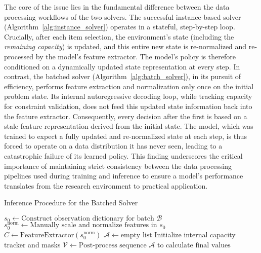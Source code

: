 The core of the issue lies in the fundamental difference between the data processing workflows of the two solvers.
The successful instance-based solver (Algorithm~\ref{alg:instance_solver}) operates in a stateful, step-by-step loop.
Crucially, after each item selection, the environment's state (including the \textit{remaining capacity}) is updated, and this entire new state is re-normalized and re-processed by the model's feature extractor.
The model's policy is therefore conditioned on a dynamically updated state representation at every step.
In contrast, the batched solver (Algorithm~\ref{alg:batch_solver}), in its pursuit of efficiency, performs feature extraction and normalization only once on the initial problem state.
Its internal autoregressive decoding loop, while tracking capacity for constraint validation, does not feed this updated state information back into the feature extractor.
Consequently, every decision after the first is based on a stale feature representation derived from the initial state.
The model, which was trained to expect a fully updated and re-normalized state at each step, is thus forced to operate on a data distribution it has never seen, leading to a catastrophic failure of its learned policy.
This finding underscores the critical importance of maintaining strict consistency between the data processing pipelines used during training and inference to ensure a model's performance translates from the research environment to practical application.

\begin{algorithm}[htbp]
    \caption{Inference Procedure for the Batched Solver}
    \label{alg:batch_solver}
    \BlankLine
    $s_0 \leftarrow \text{Construct observation dictionary for batch } \mathcal{B}$\;
    $s_0^{\text{norm}} \leftarrow \text{Manually scale and normalize features in } s_0$\;
    $C \leftarrow \mathrm{FeatureExtractor}(s_0^{\text{norm}})$\;
    \BlankLine
    $\mathcal{A} \leftarrow \text{empty list}$\;
    Initialize internal capacity tracker and masks\;
    \BlankLine
    \BlankLine
    $\mathcal{V} \leftarrow \text{Post-process sequence } \mathcal{A} \text{ to calculate final values}$\;
    \;
\end{algorithm}

